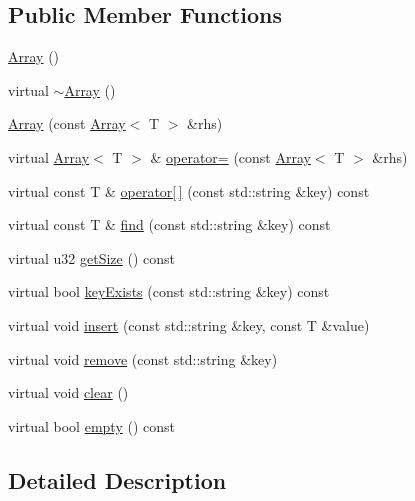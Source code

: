 \subsection*{Public Member Functions}
\begin{DoxyCompactItemize}
\item 
\hyperlink{class_micro_f_p_s_1_1core_1_1_array_abe2e8a29057e0f68f02ab23d71681b92}{Array} ()
\item 
virtual \hyperlink{class_micro_f_p_s_1_1core_1_1_array_a461a016b03610eae9fe55fb4a46c5439}{$\sim$Array} ()
\item 
\hyperlink{class_micro_f_p_s_1_1core_1_1_array_aa79d24c7c043f43ca7d6638d9910f05f}{Array} (const \hyperlink{class_micro_f_p_s_1_1core_1_1_array}{Array}$<$ T $>$ \&rhs)
\item 
virtual \hyperlink{class_micro_f_p_s_1_1core_1_1_array}{Array}$<$ T $>$ \& \hyperlink{class_micro_f_p_s_1_1core_1_1_array_a8aefd446b58f064c5bcb288d3bfcd641}{operator=} (const \hyperlink{class_micro_f_p_s_1_1core_1_1_array}{Array}$<$ T $>$ \&rhs)
\item 
virtual const T \& \hyperlink{class_micro_f_p_s_1_1core_1_1_array_a1838d4ce976773291ea69f6109d2ee95}{operator\mbox{[}$\,$\mbox{]}} (const std::string \&key) const 
\item 
virtual const T \& \hyperlink{class_micro_f_p_s_1_1core_1_1_array_a4965e35b100332b8ee2c165437a050c0}{find} (const std::string \&key) const 
\item 
virtual u32 \hyperlink{class_micro_f_p_s_1_1core_1_1_array_a7baa1f516b3e803e2d3b2c0c53c2d0a1}{getSize} () const 
\item 
virtual bool \hyperlink{class_micro_f_p_s_1_1core_1_1_array_ae3af879d40c9cd938490ef4482dcd906}{keyExists} (const std::string \&key) const 
\item 
virtual void \hyperlink{class_micro_f_p_s_1_1core_1_1_array_a810b431d29f7a7e723fa8ee7d5195056}{insert} (const std::string \&key, const T \&value)
\item 
virtual void \hyperlink{class_micro_f_p_s_1_1core_1_1_array_a9109e034d60452896a9dfca14aa666d9}{remove} (const std::string \&key)
\item 
virtual void \hyperlink{class_micro_f_p_s_1_1core_1_1_array_ac2fc2f354da317a94fb00c06c263470c}{clear} ()
\item 
virtual bool \hyperlink{class_micro_f_p_s_1_1core_1_1_array_abaf4b55d44550ed2e087e5ba80a84841}{empty} () const 
\end{DoxyCompactItemize}


\subsection{Detailed Description}
